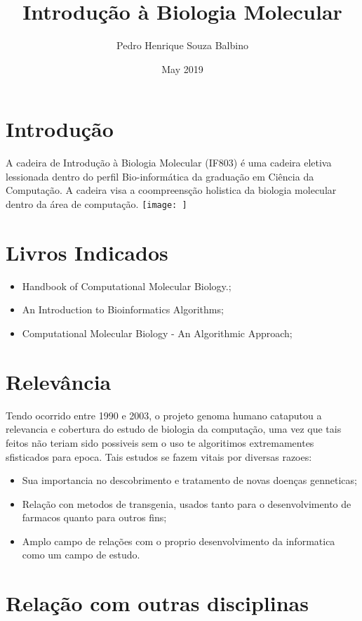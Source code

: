 \documentclass{article}
\title{Introdução à Biologia Molecular}
\author{Pedro Henrique Souza Balbino}
\date{May 2019}
\begin{document}
\maketitle

\centering
\section{Introdução}
A cadeira de Introdução à Biologia Molecular (IF803) é uma cadeira eletiva lessionada dentro do perfil Bio-informática da graduação em Ciência da Computação. A cadeira visa a coompreensção holistica da biologia molecular dentro da área de computação.
\texttt{[image: ]} \centering \citep{Imagem}

\section{Livros Indicados}
\begin{itemize}
    \item Handbook of Computational Molecular Biology.; \citep{HandBook}
    \item An Introduction to Bioinformatics Algorithms; \citep{AnIntroduction}
    \item Computational Molecular Biology - An Algorithmic Approach; \citep{Computacional}
\end{itemize}

\section{Relevância}
Tendo ocorrido entre 1990 e 2003, o projeto genoma humano cataputou a relevancia e cobertura do estudo de biologia da computação, uma vez que tais feitos não teriam sido possiveis sem o uso te algoritimos extremamentes sfisticados para epoca. \hfill \break
Tais estudos se fazem vitais por diversas razoes:

\begin{itemize}
    \item Sua importancia no descobrimento e tratamento de novas doenças genneticas;
    \item Relação con metodos de transgenia, usados tanto para o desenvolvimento de farmacos quanto para outros fins;
    \item Amplo campo de relações com o proprio desenvolvimento da informatica como um campo de estudo.
\end{itemize}

\section{Relação com outras disciplinas}
\end{document}

